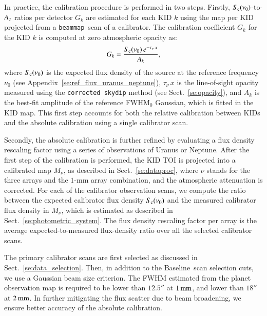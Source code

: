 \documentclass[traditionalabstract]{aa}
\newcommand{\bm}{{\tt beammap}}
\newcommand{\baseline}{Baseline}%
\newcommand{\taunu}{\tau_{\nu}}
\newcommand{\lp}[1]{#1}
\begin{document}
{{\lp In practice, the calibration procedure is performed in two steps. Firstly,
$S_{\rm{c}}(\nu_{0})$-to-$A_{\rm{c}}$ ratios per detector $G_k$
are estimated for each KID $k$ using the map per KID projected from
a \bm\ scan of a calibrator. The calibration coefficient $G_k$
for the KID $k$ is computed at zero atmospheric opacity as:
\begin{equation}
  G_k = \frac{S_{\rm{c}}(\nu_0)\, e^{-\taunu\,x}}{A_k},
  \label{eq:kid_gain}
\end{equation}
where $S_{\rm{c}}(\nu_0)$ is the expected flux density of the source at
the reference frequency $\nu_0$ (see
Appendix~\ref{se:ref_flux_uranus_neptune}), $\taunu\, x$ is the
line-of-sight opacity measured using the {\tt corrected skydip} method
(see Sect.~\ref{se:opacity}), and $A_k$ is the best-fit
amplitude of the reference FWHM$_0$ Gaussian, which is fitted in the
KID map. %
This first step accounts for both the relative calibration between KIDs and the absolute
calibration using a single calibrator scan.

Secondly, the absolute calibration is further refined by evaluating a
flux density rescaling factor using a series of observations of
Uranus or Neptune. After the first step of the calibration is
performed, the KID TOI is projected into a calibrated map $M_\nu$, as
described in Sect.~\ref{se:dataproc}, where $\nu$ stands for the three
arrays and the $1$-mm array combination, and the atmospheric attenuation
is corrected. For each of the calibrator observation scans, we
compute the ratio between the expected calibrator flux density
$S_{\rm{c}}(\nu_{0})$ and the measured calibrator flux density in $M_\nu$, which
is estimated as described in Sect.~\ref{se:photometric_system}. The
flux density rescaling factor per array is the average
expected-to-measured flux-density ratio over all the selected calibrator scans.} 

The primary calibrator scans are first selected as discussed in
Sect.~\ref{se:data_selection}. Then, in addition to
the \baseline\ scan selection cuts, we use a Gaussian beam size
criterion. The FWHM estimated from the planet
observation map is required to be lower than $12.5''$ at $1\,\rm{mm}$, and lower
than $18''$ at $2\,\rm{mm}$. In further mitigating the flux scatter
due to beam broadening, we ensure better accuracy of the absolute
calibration.



}
\end{document}
